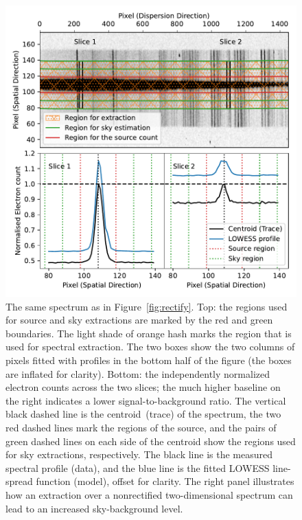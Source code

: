 \documentclass[linenumbers, twocolumn]{aastex631}
\begin{document}
\begin{figure}
    \centering
    \includegraphics[width=\columnwidth]{fig_03_extraction_profile.pdf}
    \caption{The same spectrum as in Figure~\ref{fig:rectify}. Top:
    the regions used for source and sky extractions are marked
    by the red and green boundaries. The light shade of orange
    hash marks the region that is used for spectral extraction.
    The two boxes show the two columns of pixels fitted with
    profiles in the bottom half of the figure (the boxes are inflated
    for clarity). Bottom: the independently normalized electron
    counts across the two slices; the much higher baseline on the right indicates a lower signal-to-background ratio. The vertical black dashed
    line is the centroid~(trace) of the spectrum, the two red dashed lines
    mark the regions of the source, and the pairs of green dashed lines on
    each side of the centroid show the regions used for sky extractions,
    respectively. The black line is the measured spectral profile (data), and
    the blue line is the fitted LOWESS line-spread function (model), offset for
    clarity. The right panel illustrates how an extraction over a nonrectified
    two-dimensional spectrum can lead to an increased sky-background level.}
    \label{fig:extraction}
\end{figure}
\end{document}
